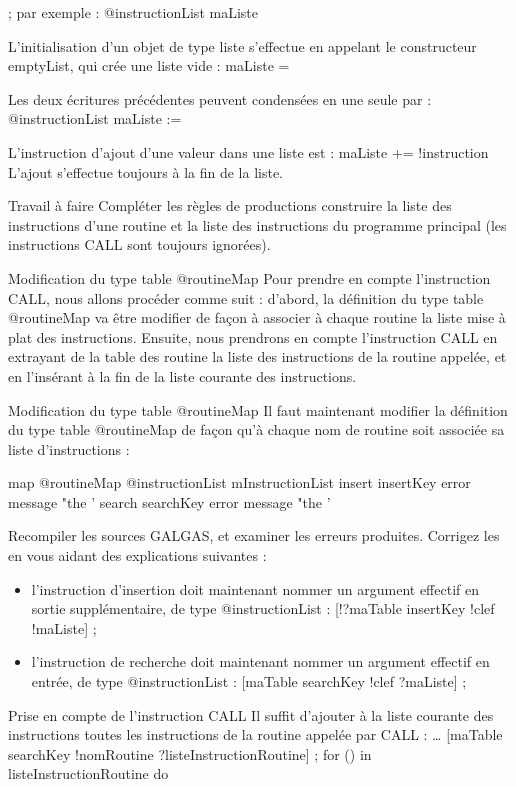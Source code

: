 ; par exemple :
	@instructionList maListe

L'initialisation d'un objet de type liste s'effectue en appelant le constructeur emptyList, qui crée une liste vide :
	maListe = {}

Les deux écritures précédentes peuvent condensées en une seule par :
	@instructionList maListe := {}

L'instruction d'ajout d'une valeur dans une liste est :
	maListe += !instruction
L'ajout s'effectue toujours à la fin de la liste.

Travail à faire
Compléter les règles de productions construire la liste des instructions d'une routine et la liste des instructions du programme principal (les instructions CALL sont toujours ignorées).

Modification du type table @routineMap
Pour prendre en compte l’instruction CALL, nous allons procéder comme suit : d’abord, la définition du type table @routineMap va être modifier de façon à associer à chaque routine la liste mise à plat des instructions. Ensuite, nous prendrons en compte l’instruction CALL en extrayant de la table des routine la liste des instructions de la routine appelée, et en l’insérant à la fin de la liste courante des instructions.

Modification du type table @routineMap
Il faut maintenant modifier la définition du type table @routineMap de façon qu'à chaque nom de routine soit associée sa liste d'instructions :

\begin{galgascode}
map @routineMap {
  @instructionList mInstructionList
  insert insertKey  error message "the '%
  search searchKey error message "the '%
}
\end{galgascode}

Recompiler les sources GALGAS, et examiner les erreurs produites. Corrigez les en vous aidant des explications suivantes :
\begin{itemize}
  \item l'instruction d'insertion doit maintenant nommer un argument effectif en sortie supplémentaire, de type @instructionList :
[!?maTable insertKey !clef !maListe] ;
  \item l'instruction de recherche doit maintenant nommer un argument effectif en entrée, de type @instructionList :
[maTable searchKey !clef ?maListe] ;
\end{itemize}

Prise en compte de l'instruction CALL
Il suffit d'ajouter à la liste courante des instructions toutes les instructions de la routine appelée par CALL :
…
[maTable searchKey !nomRoutine ?listeInstructionRoutine] ;
for () in listeInstructionRoutine do

